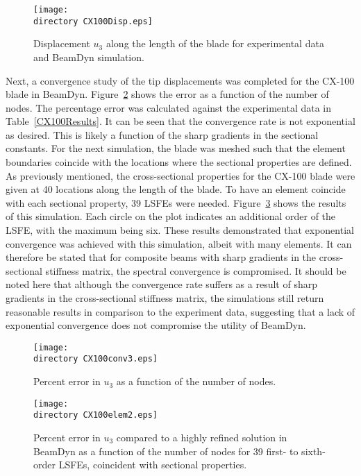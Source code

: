 \documentclass{aiaa-tc}
\def\directory{EPSF/}
\begin{document}
\begin{figure}
\centering
\texttt{[image: \\directory CX100Disp.eps]}
\caption{Displacement $u_3$ along the length of the blade for experimental data and BeamDyn simulation.} 
\label{CX100Disp}
\end{figure}

Next, a convergence study of the tip displacements was completed for the CX-100 blade in BeamDyn. Figure~\ref{CX100conv3} shows the error as a function of the number of nodes. The percentage error was calculated against the experimental data in Table~\ref{CX100Results}. It can be seen that the convergence rate is not exponential as desired. This is likely a function of the sharp gradients in the sectional constants. For the next simulation, the blade was meshed such that the element boundaries coincide with the locations where the sectional properties are defined. As previously mentioned, the cross-sectional properties for the CX-100 blade were given at 40 locations along the length of the blade. To have an element coincide with each sectional property, 39 LSFEs were needed. Figure~\ref{CX100elem2} shows the results of this simulation. Each circle on the plot indicates an additional order of the LSFE, with the maximum being six. These results demonstrated that  exponential convergence was achieved with this simulation, albeit with many elements. It can therefore be stated that for composite beams with sharp gradients in the cross-sectional stiffness matrix, the spectral convergence is compromised. It should be noted here that although the convergence rate suffers as a result of sharp gradients in the cross-sectional stiffness matrix, the simulations still return reasonable results in comparison to the experiment data, suggesting that a lack of exponential convergence does not compromise the utility of BeamDyn.
  

\begin{figure}
\centering
\texttt{[image: \\directory CX100conv3.eps]}
\caption{ Percent error in $u_3$ as a function of the number of nodes.} 
\label{CX100conv3}
\end{figure}

\begin{figure}
\centering
\texttt{[image: \\directory CX100elem2.eps]}
\caption{Percent error in $u_3$ compared to a highly refined solution in BeamDyn as a function of the number of nodes for 39 first- to sixth-order LSFEs, coincident with sectional properties.} 
\label{CX100elem2}
\end{figure}
\end{document}
